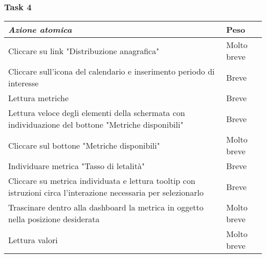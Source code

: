 \subsubsection{Task 4}
\label{sss:iaa-task-4}

{
\renewcommand{\arraystretch}{2}
\begin{longtable}[h]{| p{14cm} | p{2.5cm} |}
    \hline
    \textit{Azione atomica} & \textbf{Peso} \\
    \hline
    \endhead
    Cliccare su link "Distribuzione anagrafica" & Molto breve \\
    \hline
    Cliccare sull'icona del calendario e inserimento periodo di interesse & Breve  \\
    \hline
    Lettura metriche & Breve \\
    \hline
    Lettura veloce degli elementi della schermata con individuazione del bottone "Metriche disponibili" & Breve \\
    \hline
    Cliccare sul bottone "Metriche disponibili" & Molto breve \\
    \hline
    Individuare metrica "Tasso di letalità"  & Breve \\
    \hline
    Cliccare su metrica individuata e lettura tooltip con istruzioni circa l'interazione necessaria per selezionarlo & Breve \\
    \hline
    Trascinare dentro alla dashboard la metrica in oggetto nella posizione desiderata & Molto breve \\
    \hline
    Lettura valori & Molto breve \\
    \hline
\end{longtable}
}
